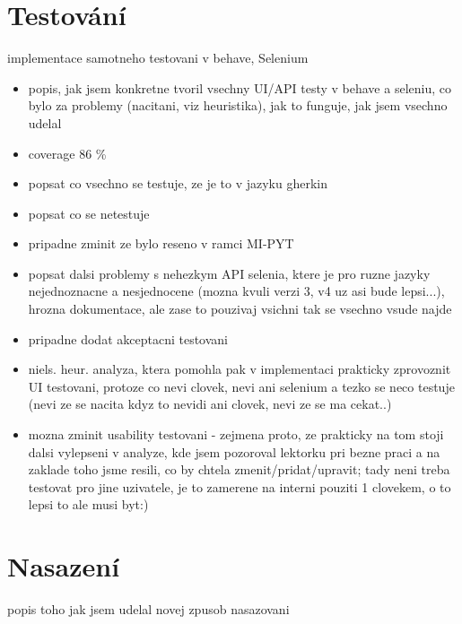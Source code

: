 \chapter{Testování}
implementace samotneho testovani v behave, Selenium
\begin{itemize}
\item popis, jak jsem konkretne tvoril vsechny UI/API testy v behave a seleniu, co bylo za problemy (nacitani, viz heuristika), jak to funguje, jak jsem vsechno udelal
\item coverage 86 \%
\item popsat co vsechno se testuje, ze je to v jazyku gherkin
\item popsat co se netestuje
\item pripadne zminit ze bylo reseno v ramci MI-PYT
\item popsat dalsi problemy s nehezkym API selenia, ktere je pro ruzne jazyky nejednoznacne a nesjednocene (mozna kvuli verzi 3, v4 uz asi bude lepsi...), hrozna dokumentace, ale zase to pouzivaj vsichni tak se vsechno vsude najde
\item pripadne dodat akceptacni testovani
\item niels. heur. analyza, ktera pomohla pak v implementaci prakticky zprovoznit UI testovani, protoze co nevi clovek, nevi ani selenium a tezko se neco testuje (nevi ze se nacita kdyz to nevidi ani clovek, nevi ze se ma cekat..)
\item mozna zminit usability testovani - zejmena proto, ze prakticky na tom stoji dalsi vylepseni v analyze, kde jsem pozoroval lektorku pri bezne praci a na zaklade toho jsme resili, co by chtela zmenit/pridat/upravit; tady neni treba testovat pro jine uzivatele, je to zamerene na interni pouziti 1 clovekem, o to lepsi to ale musi byt:)
\end{itemize}


\chapter{Nasazení}
popis toho jak jsem udelal novej zpusob nasazovani

